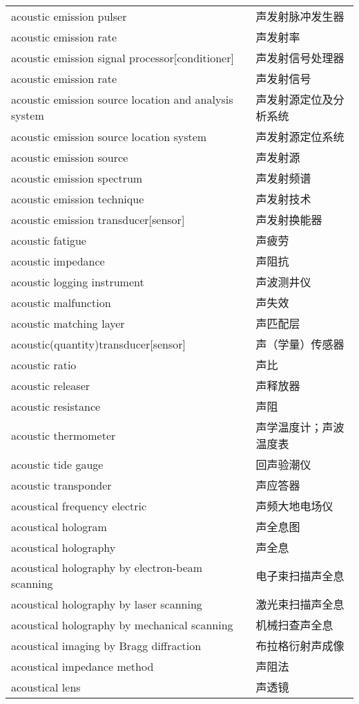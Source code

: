 \documentclass[
]{article}
\begin{document}
\begin{longtable}[]{@{}ll@{}}
acoustic emission pulser & 声发射脉冲发生器 \\
acoustic emission rate & 声发射率 \\
acoustic emission signal processor{[}conditioner{]} &
声发射信号处理器 \\
acoustic emission rate & 声发射信号 \\
acoustic emission source location and analysis system &
声发射源定位及分析系统 \\
acoustic emission source location system & 声发射源定位系统 \\
acoustic emission source & 声发射源 \\
acoustic emission spectrum & 声发射频谱 \\
acoustic emission technique & 声发射技术 \\
acoustic emission transducer{[}sensor{]} & 声发射换能器 \\
acoustic fatigue & 声疲劳 \\
acoustic impedance & 声阻抗 \\
acoustic logging instrument & 声波测井仪 \\
acoustic malfunction & 声失效 \\
acoustic matching layer & 声匹配层 \\
acoustic(quantity)transducer{[}sensor{]} & 声（学量）传感器 \\
acoustic ratio & 声比 \\
acoustic releaser & 声释放器 \\
acoustic resistance & 声阻 \\
acoustic thermometer & 声学温度计；声波温度表 \\
acoustic tide gauge & 回声验潮仪 \\
acoustic transponder & 声应答器 \\
acoustical frequency electric & 声频大地电场仪 \\
acoustical hologram & 声全息图 \\
acoustical holography & 声全息 \\
acoustical holography by electron-beam scanning & 电子束扫描声全息 \\
acoustical holography by laser scanning & 激光束扫描声全息 \\
acoustical holography by mechanical scanning & 机械扫查声全息 \\
acoustical imaging by Bragg diffraction & 布拉格衍射声成像 \\
acoustical impedance method & 声阻法 \\
acoustical lens & 声透镜 \\

\end{longtable}
\end{document}
